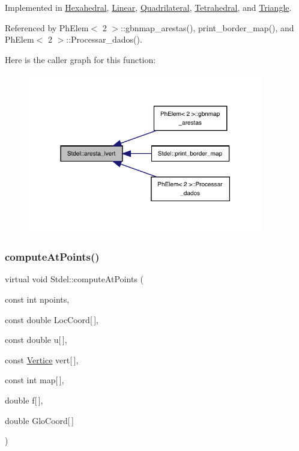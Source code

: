 Implemented in \hyperlink{classHexahedral_a75bd23113c34de6bef3bcee8957f8f99}{Hexahedral}, \hyperlink{classLinear_a1111d1b38590d73c38e2a09b57ed8413}{Linear}, \hyperlink{classQuadrilateral_acfc70a6c1737d40c4f5f4fb38525f929}{Quadrilateral}, \hyperlink{classTetrahedral_af307024c2e9c29d98b46b961208e1c0d}{Tetrahedral}, and \hyperlink{classTriangle_a55b14526652cdeaff82e07083c36a7ba}{Triangle}.



Referenced by Ph\+Elem$<$ 2 $>$\+::gbnmap\+\_\+arestas(), print\+\_\+border\+\_\+map(), and Ph\+Elem$<$ 2 $>$\+::\+Processar\+\_\+dados().

Here is the caller graph for this function\+:
\nopagebreak
\begin{figure}[H]
\begin{center}
\leavevmode
\includegraphics[width=291pt]{classStdel_a69b8ef7def7891fcb2d5d8fd9b75bdc8_icgraph}
\end{center}
\end{figure}
\mbox{\label{classStdel_a03e038055d238608efce470629863c36}} 
\subsubsection{\texorpdfstring{compute\+At\+Points()}{computeAtPoints()}}
{\footnotesize\ttfamily virtual void Stdel\+::compute\+At\+Points (\begin{DoxyParamCaption}\item[{const int}]{npoints,  }\item[{const double}]{Loc\+Coord\mbox{[}$\,$\mbox{]},  }\item[{const double}]{u\mbox{[}$\,$\mbox{]},  }\item[{const \hyperlink{structVertice}{Vertice}}]{vert\mbox{[}$\,$\mbox{]},  }\item[{const int}]{map\mbox{[}$\,$\mbox{]},  }\item[{double}]{f\mbox{[}$\,$\mbox{]},  }\item[{double}]{Glo\+Coord\mbox{[}$\,$\mbox{]} }\end{DoxyParamCaption})\hspace{0.3cm}{\ttfamily [pure virtual]}}



